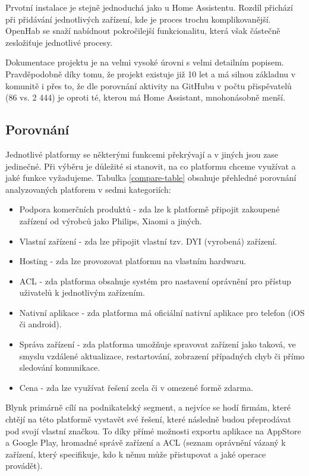 Prvotní instalace je stejně jednoduchá jako u Home Assistentu. Rozdíl přichází při přidávání jednotlivých zařízení, kde je proces trochu komplikovanější. OpenHab se snaží nabídnout pokročilejší funkcionalitu, která však částečně zesložiťuje jednotlivé procesy. \cite{openhab-doc}

Dokumentace projektu je na velmi vysoké úrovni s velmi detailním popisem. Pravděpodobně díky tomu, že projekt existuje již 10 let a má silnou základnu v komunitě i přes to, že dle porovnání aktivity na GitHubu v počtu přispěvatelů (86 vs. 2 444) je oproti té, kterou má Home Assistant, mnohonásobně menší.

\subsection{Porovnání}
Jednotlivé platformy se některými funkcemi překrývají a v jiných jsou zase jedinečné. Při výběru je důležité si stanovit, na co platformu chceme využívat a jaké funkce vyžadujeme. Tabulka \ref{compare-table} obsahuje přehledné porovnání analyzovaných platforem v sedmi kategoriích:
\begin{itemize}
    \item Podpora komerčních produktů - zda lze k platformě připojit zakoupené zařízení od výrobců jako Philips, Xiaomi a jiných.
    \item Vlastní zařízení - zda lze připojit vlastní tzv. DYI (vyrobená) zařízení.
    \item Hosting - zda lze provozovat platformu na vlastním hardwaru.
    \item ACL - zda platforma obsahuje systém pro nastavení oprávnění pro přístup uživatelů k jednotlivým zařízením.
    \item Nativní aplikace - zda platforma má oficiální nativní aplikace pro telefon (iOS či android).
    \item Správa zařízení - zda platforma umožňuje spravovat zařízení jako taková, ve smyslu vzdálené aktualizace, restartování, zobrazení případných chyb či přímo sledování komunikace.
    \item Cena - zda lze využívat řešení zcela či v omezené formě zdarma.
\end{itemize}

Blynk primárně cílí na podnikatelský segment, a nejvíce se hodí firmám, které chtějí na této platformě vystavět své řešení, které následně budou přeprodávat pod svojí vlastní značkou. To díky přímé možnosti exportu aplikace na AppStore a Google Play, hromadné správě zařízení a ACL (seznam oprávnění vázaný k zařízení, který specifikuje, kdo k němu může přistupovat a jaké operace provádět).

